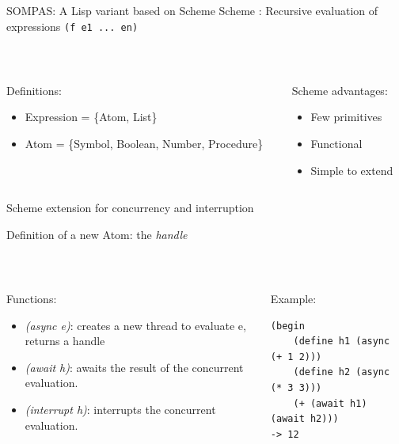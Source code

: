 
\begin{frame}[fragile]{SOMPAS: A Lisp variant based on Scheme}
    \centering
    Scheme : Recursive evaluation of expressions \verb|(f e1 ... en)|
    
    ~~

\pause
    \begin{columns}[t]
        \begin{column}{0.6\textwidth}
            Definitions:
            \begin{itemize}
                \item Expression = \{Atom, List\}
                \item Atom = \{Symbol, Boolean, Number, Procedure\}
            \end{itemize}
\pause
        \end{column}
        \begin{column}{0.4\textwidth}
            Scheme advantages:
            \begin{itemize}
                \item Few primitives
                \item Functional
                \item Simple to extend
            \end{itemize}
        \end{column}
     \end{columns}

\end{frame}

\begin{frame}[fragile]{Scheme extension for concurrency and interruption}

    Definition of a new Atom: the \emph{handle}
    
    ~~
\pause
    \begin{columns}
        \begin{column}{0.6\textwidth}
            Functions:
            \begin{itemize}
                \item \textit{(async e)}: creates a new thread to evaluate e, returns a handle
                \item \textit{(await h)}: awaits the result of the concurrent evaluation.
                \item \textit{(interrupt h)}: interrupts the concurrent evaluation.
            \end{itemize}
        \end{column}
        \pause
        \begin{column}{0.4\textwidth}
        Example: 
\small
\lstset{columns=fullflexible}
            \begin{lstlisting}
(begin
    (define h1 (async (+ 1 2)))
    (define h2 (async (* 3 3)))
    (+ (await h1) (await h2)))
-> 12 
            \end{lstlisting}
        \end{column}
    \end{columns}
\end{frame}



